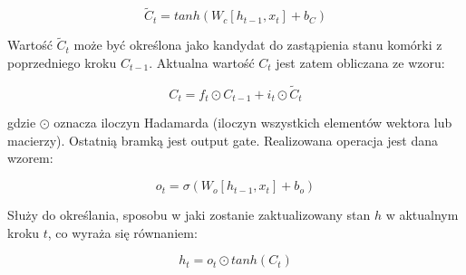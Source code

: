 \documentclass[oneside, mag]{mgr}
\begin{document}
\begin{equation}
	\tilde{C}_t = tanh( W_c [ h_{t-1}, x_t ] + b_C )
\end{equation}

Wartość $\tilde{C}_t$ może być określona jako kandydat do zastąpienia stanu komórki z poprzedniego kroku $C_{t-1}$. Aktualna wartość $C_t$ jest zatem obliczana ze wzoru:

\begin{equation}
	C_t = f_t \odot C_{t-1} + i_t \odot \tilde{C}_t
\end{equation}

gdzie $\odot$ oznacza iloczyn Hadamarda (iloczyn wszystkich elementów wektora lub macierzy). Ostatnią bramką jest output gate. Realizowana operacja jest dana wzorem:

\begin{equation}
	o_t = \sigma( W_o [ h_{t-1}, x_t ] + b_o )
\end{equation}

Służy do określania, sposobu w jaki zostanie zaktualizowany stan $h$ w aktualnym kroku $t$, co wyraża się równaniem:

\begin{equation}
	h_t = o_t \odot tanh( C_t )
\end{equation}
\end{document}
